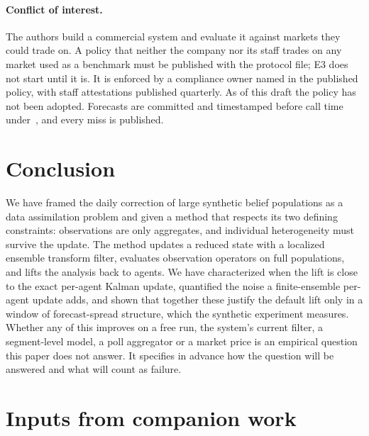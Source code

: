 \documentclass[10pt]{article}
\theoremstyle{remark}
\begin{document}
\paragraph{Conflict of interest.} The authors build a commercial system and evaluate it against markets they could trade on. A policy that neither the company nor its staff trades on any market used as a benchmark must be published with the protocol file; E3 does not start until it is. It is enforced by a compliance owner named in the published policy, with staff attestations published quarterly. As of this draft the policy has not been adopted. Forecasts are committed and timestamped before call time under~\cite{rw_receipts}, and every miss is published.

\section{Conclusion}
We have framed the daily correction of large synthetic belief populations as a data assimilation problem and given a method that respects its two defining constraints: observations are only aggregates, and individual heterogeneity must survive the update. The method updates a reduced state with a localized ensemble transform filter, evaluates observation operators on full populations, and lifts the analysis back to agents. We have characterized when the lift is close to the exact per-agent Kalman update, quantified the noise a finite-ensemble per-agent update adds, and shown that together these justify the default lift only in a window of forecast-spread structure, which the synthetic experiment measures. Whether any of this improves on a free run, the system's current filter, a segment-level model, a poll aggregator or a market price is an empirical question this paper does not answer. It specifies in advance how the question will be answered and what will count as failure.

\appendix
\section{Inputs from companion work}
\label{app:inputs}
\end{document}

